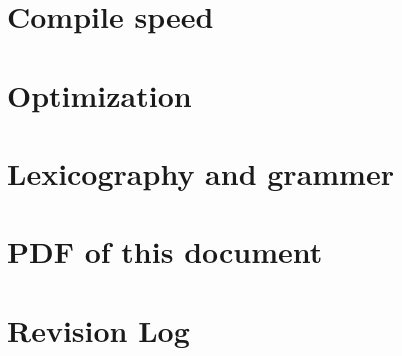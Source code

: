 \documentclass{report}
\begin{document}


\chapter{Compile speed}



\chapter{Optimization}



\appendix
\begin{htmlonly}
\chapter{Lexicography and grammer}


\chapter{PDF of this document}

\end{htmlonly}
  
\chapter{Revision Log}



\end{document}
